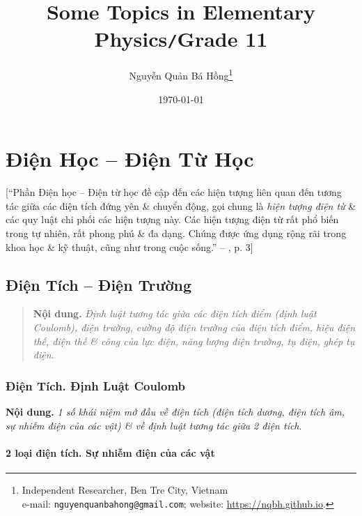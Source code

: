 \documentclass[oneside]{book}
\title{Some Topics in Elementary Physics\texttt{/}Grade 11}
\author{Nguyễn Quản Bá Hồng\footnote{Independent Researcher, Ben Tre City, Vietnam\\e-mail: \texttt{nguyenquanbahong@gmail.com}; website: \url{https://nqbh.github.io}.}}
\date{\today}
\numberwithin{equation}{section}
\begin{document}
\frontmatter
\maketitle
\setcounter{secnumdepth}{4}
\setcounter{tocdepth}{3}
\tableofcontents
\newpage


\mainmatter
\part{Điện Học -- Điện Từ Học}
[``Phần Điện học -- Điện từ học đề cập đến các hiện tượng liên quan đến tương tác giữa các điện tích đứng yên \& chuyển động, gọi chung là \textit{hiện tượng điện từ} \& các quy luật chi phối các hiện tượng này. Các hiện tượng điện từ rất phổ biến trong tự nhiên, rất phong phú \& đa dạng. Chúng được ứng dụng rộng rãi trong khoa học \& kỹ thuật, cũng như trong cuộc sống.'' -- \cite{SGK_Vat_Ly_11_nang_cao}, p. 3]

\chapter{Điện Tích -- Điện Trường}

\begin{quotation}
	\textbf{Nội dung.} \textit{Định luật tương tác giữa các điện tích điểm (định luật Coulomb), điện trường, cường độ điện trường của điện tích điểm, hiệu điện thế, điện thế \& công của lực điện, năng lượng điện trường, tụ điện, ghép tụ điện}.
\end{quotation}

\section{Điện Tích. Định Luật Coulomb}
\textbf{Nội dung.} \textit{1 số khái niệm mở đầu về điện tích (điện tích dương, điện tích âm, sự nhiễm điện của các vật) \& về định luật tương tác giữa 2 điện tích}.

\subsection{2 loại điện tích. Sự nhiễm điện của các vật}
\end{document}
